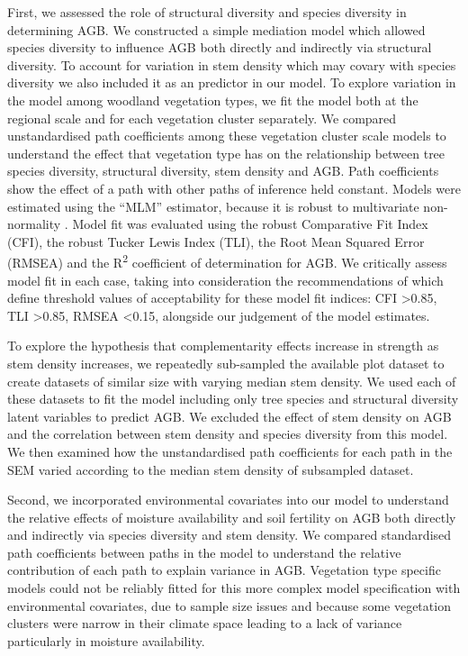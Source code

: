 \documentclass[11pt,a4paper]{article}
\begin{document}
First, we assessed the role of structural diversity and species diversity in determining AGB. We constructed a simple mediation model which allowed species diversity to influence AGB both directly and indirectly via structural diversity. To account for variation in stem density which may covary with species diversity we also included it as an predictor in our model. To explore variation in the model among woodland vegetation types, we fit the model both at the regional scale and for each vegetation cluster separately. We compared unstandardised path coefficients among these vegetation cluster scale models to understand the effect that vegetation type has on the relationship between tree species diversity, structural diversity, stem density and AGB. Path coefficients show the effect of a path with other paths of inference held constant. Models were estimated using the ``MLM'' estimator, because it is robust to multivariate non-normality \citep{Shapiro1983}. Model fit was evaluated using the robust Comparative Fit Index (CFI), the robust Tucker Lewis Index (TLI), the Root Mean Squared Error (RMSEA) and the R\textsuperscript{2} coefficient of determination for AGB. We critically assess model fit in each case, taking into consideration the recommendations of \citet{Hu1999} which define threshold values of acceptability for these model fit indices: CFI >0.85, TLI >0.85, RMSEA <0.15, alongside our judgement of the model estimates.

To explore the hypothesis that complementarity effects increase in strength as stem density increases, we repeatedly sub-sampled the available plot dataset to create \subn{} datasets of similar size with varying median stem density. We used each of these datasets to fit the model including only tree species and structural diversity latent variables to predict AGB. We excluded the effect of stem density on AGB and the correlation between stem density and species diversity from this model. We then examined how the unstandardised path coefficients for each path in the SEM varied according to the median stem density of subsampled dataset.

Second, we incorporated environmental covariates into our model to understand the relative effects of moisture availability and soil fertility on AGB both directly and indirectly via species diversity and stem density. We compared standardised path coefficients between paths in the model to understand the relative contribution of each path to explain variance in AGB. Vegetation type specific models could not be reliably fitted for this more complex model specification with environmental covariates, due to sample size issues and because some vegetation clusters were narrow in their climate space leading to a lack of variance particularly in moisture availability.
\end{document}
